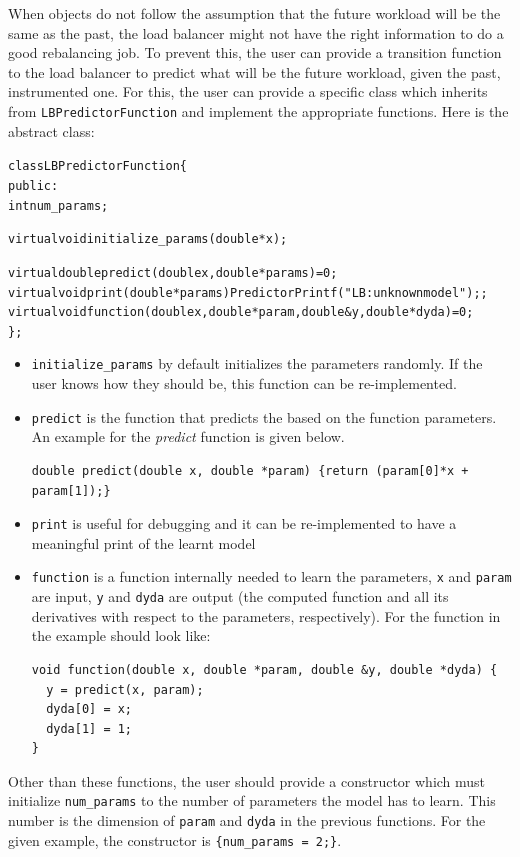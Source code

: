 When objects do not follow the assumption that the future workload will be the
same as the past, the load balancer might not have the right information to do
a good rebalancing job. To prevent this, the user can provide a transition
function to the load balancer to predict what will be the future workload, given
the past, instrumented one. For this, the user can provide a specific class
which inherits from {\tt LBPredictorFunction} and implement the appropriate functions. 
Here is the abstract class:
\begin{alltt}
class LBPredictorFunction \{
public:
  int num_params;
 
  virtual void initialize_params(double *x);

  virtual double predict(double x, double *params) =0;
  virtual void print(double *params) {PredictorPrintf("LB: unknown model");};
  virtual void function(double x, double *param, double &y, double *dyda) =0;
\};
\end{alltt}
\begin{itemize}
\item {\tt initialize\_params} by default initializes the parameters randomly. If the user
knows how they should be, this function can be re-implemented.
\item {\tt predict} is the function that predicts the based on the function parameters.
An example for the {\em predict} function is given below.
\begin{verbatim}
double predict(double x, double *param) {return (param[0]*x + param[1]);}
\end{verbatim}
\item {\tt print} is useful for debugging and it can be re-implemented to have a meaningful
print of the learnt model
\item {\tt function} is a function internally needed to learn the parameters, {\tt x} and
{\tt param} are input, {\tt y} and {\tt dyda} are output (the computed function and
all its derivatives with respect to the parameters, respectively).
For the function in the example should look like:
\begin{verbatim}
void function(double x, double *param, double &y, double *dyda) {
  y = predict(x, param);
  dyda[0] = x;
  dyda[1] = 1;
}
\end{verbatim}
\end{itemize}
Other than these functions, the user should provide a constructor which must initialize
{\tt num\_params} to the number of parameters the model has to learn. This number is
the dimension of {\tt param} and {\tt dyda} in the previous functions. For the given
example, the constructor is {\tt \{num\_params = 2;\}}.

